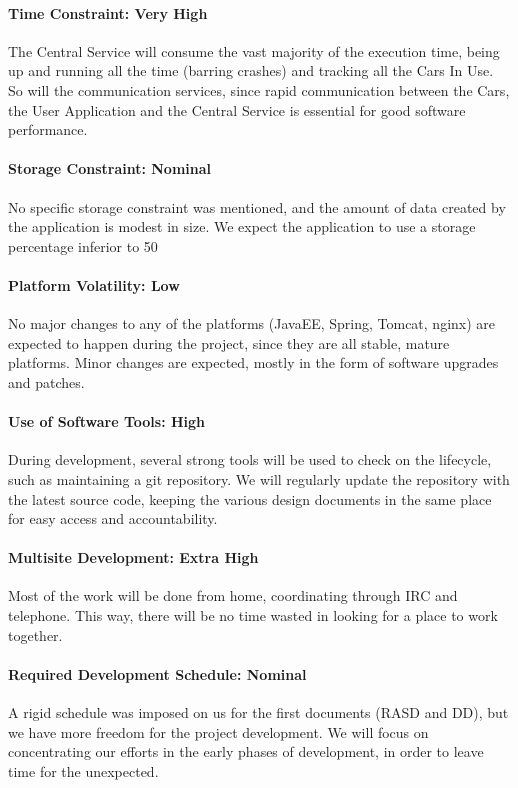 \paragraph*{Time Constraint: Very High}
The Central Service will consume the vast majority of the execution time, being up and running all the time (barring crashes) and tracking all the Cars In Use. So will the communication services, since rapid communication between the Cars, the User Application and the Central Service is essential for good software performance.

\paragraph*{Storage Constraint: Nominal}
No specific storage constraint was mentioned, and the amount of data created by the application is modest in size. We expect the application to use a storage percentage inferior to 50%

\paragraph*{Platform Volatility: Low}
No major changes to any of the platforms (JavaEE, Spring, Tomcat, nginx) are expected to happen during the project, since they are all stable, mature platforms. Minor changes are expected, mostly in the form of software upgrades and patches.

\paragraph*{Use of Software Tools: High}
During development, several strong tools will be used to check on the lifecycle, such as maintaining a git repository. We will regularly update the repository with the latest source code, keeping the various design documents in the same place for easy access and accountability.

\paragraph*{Multisite Development: Extra High}
Most of the work will be done from home, coordinating through IRC and telephone. This way, there will be no time wasted in looking for a place to work together.

\paragraph*{Required Development Schedule: Nominal}
A rigid schedule was imposed on us for the first documents (RASD and DD), but we have more freedom for the project development. We will focus on concentrating our efforts in the early phases of development, in order to leave time for the unexpected.

